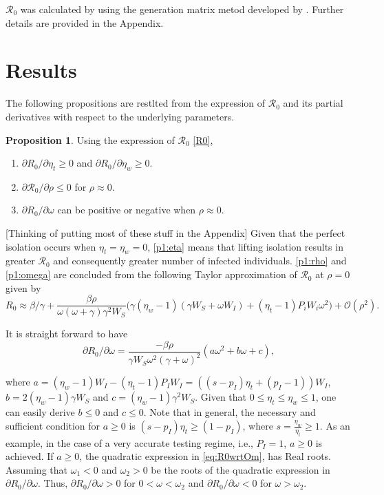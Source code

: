 \documentclass{article}
\newcommand{\Rnum}{\mathcal{R}_0}
\theoremstyle{definition} %
\newtheorem{proposition}{Proposition}
\begin{document}
$\Rnum$ was calculated by using the generation matrix metod developed by \cite{van2002reproduction}. Further details are provided in the Appendix.

\section{Results}


The following propositions are restlted from the expression of $\Rnum$ and its partial derivatives with respect to the underlying parameters.

\begin{proposition}
\label{prop1}
Using the expression of $\Rnum$ \eqref{R0},
\begin{enumerate}
\item \label{p1:eta}
$\partial{R_0}/\partial{\eta_t} \geq 0$ and $\partial{R_0}/\partial{\eta_w} \geq 0$. 
\item \label{p1:rho}
$\partial{\Rnum}/\partial{\rho} \leq 0$ for $\rho \approx 0$.
\item \label{p1:omega}
$\partial{R_0}/\partial{\omega}$ can be positive or negative when $\rho \approx 0$.
\end{enumerate}
\end{proposition}

[Thinking of putting most of these stuff in the Appendix] Given that the perfect isolation occurs when $\eta_t=\eta_w = 0$, \ref{p1:eta} means that lifting isolation results in greater $\Rnum$ and consequently greater number of infected individuals.
\ref{p1:rho} and \ref{p1:omega} are concluded from the following Taylor approximation of $\Rnum$ at $\rho=0$ given by 
\begin{equation}
\label{eq:R0appr}
R_0 \approx \beta/\gamma + \frac{\beta \rho}{\omega (\omega+\gamma) \gamma^2 W_S} \Big(\gamma(\eta_w-1)(\gamma W_S+\omega W_I) + (\eta_t -1)P_iW_i \omega^2 \Big) + \mathcal{O}(\rho^2).
\end{equation}

It is straight forward to have
\begin{equation}
\label{eq:R0wrtOm}
\partial{R_0}/\partial{\omega}=  \frac{-\beta \rho}{\gamma W_S\omega^2 (\gamma+\omega)^2}  (a \omega^2 + b \omega + c),
\end{equation}

where $a=(\eta_w-1)W_I-(\eta_t-1)P_I W_I = ((s-p_I)\eta_t + (p_I-1)) W_I$, $b=2(\eta_w-1)\gamma W_S$ and $c=(\eta_w-1)\gamma^2 W_S$.
Given that $0 \leq \eta_t\leq \eta_w \leq 1 $, one can easily derive $b\leq 0$ and $c \leq 0$. Note that in general, the necessary and sufficient condition for $a \geq 0$ is $(s-p_I) \eta_t \geq (1-p_I)$, where $s=\frac{\eta_w}{\eta_t} \geq 1$. As an example, in the case of a very accurate testing regime,  i.e., $P_I=1$, $a \geq 0$ is achieved. If $a\geq 0$, the quadratic expression in \eqref{eq:R0wrtOm}, has Real roots. Assuming that $\omega_1<0$ and $\omega_2>0$ be the roots of the quadratic expression in $\partial{R_0}/\partial{\omega}$. Thus, $\partial{R_0}/\partial{\omega}>0$ for $0<\omega<\omega_2$ and  $\partial{R_0}/\partial{\omega}<0$ for $\omega>\omega_2$.
\end{document}
